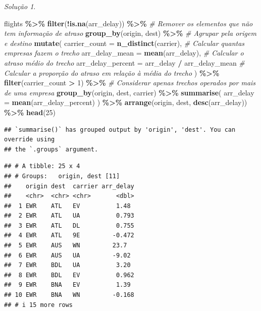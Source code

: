 \documentclass[
]{latex/krantz}
\newenvironment{Shaded}{\begin{snugshade}}{\end{snugshade}}
\newcommand{\AttributeTok}[1]{\textcolor[rgb]{0.13,0.29,0.53}{#1}}
\newcommand{\CommentTok}[1]{\textcolor[rgb]{0.56,0.35,0.01}{\textit{#1}}}
\newcommand{\DecValTok}[1]{\textcolor[rgb]{0.00,0.00,0.81}{#1}}
\newcommand{\FunctionTok}[1]{\textcolor[rgb]{0.13,0.29,0.53}{\textbf{#1}}}
\newcommand{\NormalTok}[1]{#1}
\newcommand{\SpecialCharTok}[1]{\textcolor[rgb]{0.81,0.36,0.00}{\textbf{#1}}}
\theoremstyle{definition}
\theoremstyle{definition}
\theoremstyle{definition}
\theoremstyle{definition}
\theoremstyle{remark}
\newtheorem*{solution}{Solução}
\begin{document}
\begin{solution}
\leavevmode

\begin{Shaded}
\begin{Highlighting}[]
\NormalTok{flights }\SpecialCharTok{\%\textgreater{}\%}
    \FunctionTok{filter}\NormalTok{(}\SpecialCharTok{!}\FunctionTok{is.na}\NormalTok{(arr\_delay)) }\SpecialCharTok{\%\textgreater{}\%}                           \CommentTok{\# Remover os elementos que não tem informação de atraso}
    \FunctionTok{group\_by}\NormalTok{(origin, dest) }\SpecialCharTok{\%\textgreater{}\%}                              \CommentTok{\# Agrupar pela origem e destino}
    \FunctionTok{mutate}\NormalTok{(}
        \AttributeTok{carrier\_count =} \FunctionTok{n\_distinct}\NormalTok{(carrier),                }\CommentTok{\# Calcular quantas empresas fazem o trecho}
        \AttributeTok{arr\_delay\_mean =} \FunctionTok{mean}\NormalTok{(arr\_delay),                   }\CommentTok{\# Calcular o atraso médio do trecho}
        \AttributeTok{arr\_delay\_percent =}\NormalTok{ arr\_delay }\SpecialCharTok{/}\NormalTok{ arr\_delay\_mean      }\CommentTok{\# Calcular a proporção do atraso em relação à média do trecho}
\NormalTok{    ) }\SpecialCharTok{\%\textgreater{}\%}
    \FunctionTok{filter}\NormalTok{(carrier\_count }\SpecialCharTok{\textgreater{}} \DecValTok{1}\NormalTok{) }\SpecialCharTok{\%\textgreater{}\%}                           \CommentTok{\# Considerar apenas trechos operados por mais de uma empresa    }
    \FunctionTok{group\_by}\NormalTok{(origin, dest, carrier) }\SpecialCharTok{\%\textgreater{}\%}
    \FunctionTok{summarise}\NormalTok{(}
        \AttributeTok{arr\_delay =} \FunctionTok{mean}\NormalTok{(arr\_delay\_percent)}
\NormalTok{    ) }\SpecialCharTok{\%\textgreater{}\%}
    \FunctionTok{arrange}\NormalTok{(origin, dest, }\FunctionTok{desc}\NormalTok{(arr\_delay)) }\SpecialCharTok{\%\textgreater{}\%}
    \FunctionTok{head}\NormalTok{(}\DecValTok{25}\NormalTok{)}
\end{Highlighting}
\end{Shaded}

\begin{verbatim}
## `summarise()` has grouped output by 'origin', 'dest'. You can override using
## the `.groups` argument.
\end{verbatim}

\begin{verbatim}
## # A tibble: 25 x 4
## # Groups:   origin, dest [11]
##    origin dest  carrier arr_delay
##    <chr>  <chr> <chr>       <dbl>
##  1 EWR    ATL   EV          1.48 
##  2 EWR    ATL   UA          0.793
##  3 EWR    ATL   DL          0.755
##  4 EWR    ATL   9E         -0.472
##  5 EWR    AUS   WN         23.7  
##  6 EWR    AUS   UA         -9.02 
##  7 EWR    BDL   UA          3.20 
##  8 EWR    BDL   EV          0.962
##  9 EWR    BNA   EV          1.39 
## 10 EWR    BNA   WN         -0.168
## # i 15 more rows
\end{verbatim}

\end{solution}
\end{document}
